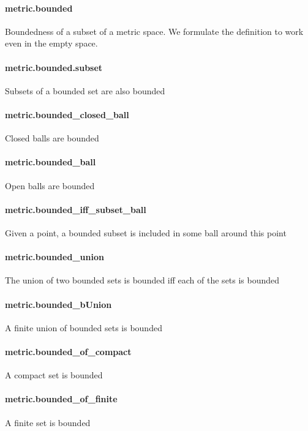 \documentclass{article}
\begin{document}
\paragraph{metric.bounded}
\par
Boundedness of a subset of a metric space. We formulate the definition to work
even in the empty space.
\paragraph{metric.bounded.subset}
\par
Subsets of a bounded set are also bounded
\paragraph{metric.bounded\_closed\_ball}
\par
Closed balls are bounded
\paragraph{metric.bounded\_ball}
\par
Open balls are bounded
\paragraph{metric.bounded\_iff\_subset\_ball}
\par
Given a point, a bounded subset is included in some ball around this point
\paragraph{metric.bounded\_union}
\par
The union of two bounded sets is bounded iff each of the sets is bounded
\paragraph{metric.bounded\_bUnion}
\par
A finite union of bounded sets is bounded
\paragraph{metric.bounded\_of\_compact}
\par
A compact set is bounded
\paragraph{metric.bounded\_of\_finite}
\par
A finite set is bounded
\end{document}
